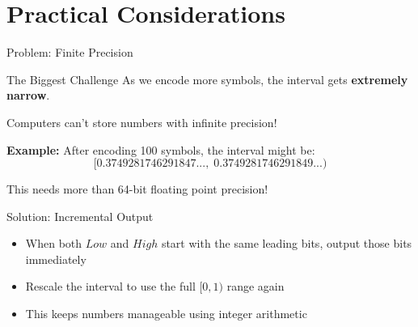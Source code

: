 \documentclass[aspectratio=169,12pt]{beamer}
\begin{document}
\section{Practical Considerations}

\begin{frame}{Problem: Finite Precision}
    \begin{alertblock}{The Biggest Challenge}
        As we encode more symbols, the interval gets \textbf{extremely narrow}.
        
        Computers can't store numbers with infinite precision!
    \end{alertblock}
    
    \vspace{0.3cm}
    \textbf{Example:} After encoding 100 symbols, the interval might be:
    \begin{equation*}
        [0.3749281746291847..., \; 0.3749281746291849...)
    \end{equation*}
    
    This needs more than 64-bit floating point precision!
    
    \vspace{0.3cm}
    \begin{block}{Solution: Incremental Output}
        \begin{itemize}
            \item When both $Low$ and $High$ start with the same leading bits, output those bits immediately
            \item Rescale the interval to use the full $[0, 1)$ range again
            \item This keeps numbers manageable using integer arithmetic
        \end{itemize}
    \end{block}
\end{frame}
\end{document}
